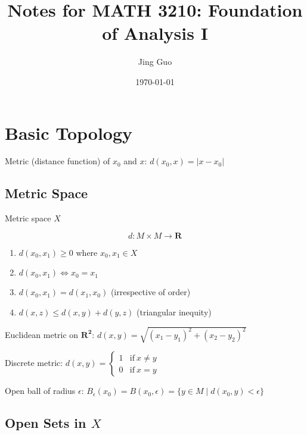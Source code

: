 \documentclass{article}
\title{Notes for MATH 3210: Foundation of Analysis I}
\author{Jing Guo}
\date{\today}
\begin{document}
    \maketitle
    \tableofcontents

    \section{Basic Topology}

    Metric (distance function) of $x_{0}$ and $x$: $d(x_{0}, x) = \lvert x - x_{0} \rvert$

    \subsection{Metric Space}

    Metric space $X$

    \begin{equation}
    d \colon M \times M \to \mathbf{R}
    \end{equation}

    \begin{enumerate}
        \item $d(x_{0}, x_{1}) \geq 0$ where $x_{0}, x_{1} \in X$
        \item $d(x_{0}, x_{1}) \iff x_{0} = x_{1}$
        \item $d(x_{0}, x_{1}) = d(x_{1}, x_{0})$ (irrespective of order)
        \item $d(x, z) \leq d(x, y) + d(y, z)$ (triangular inequity)
    \end{enumerate}

    Euclidean metric on $\mathbf{R^{2}}$:
        $d(x, y) = \sqrt{(x_{1} - y_{1})^{2} + (x_{2} - y_{2})^{2}}$

    Discrete metric: $d(x, y) = \left\{\begin{matrix}
        1 &\mbox{if}\ x \neq y \\
        0 &\mbox{if}\ x = y 
        \end{matrix}\right.$

    Open ball of radius $\epsilon$:
        $B_{\epsilon}(x_{0}) = B(x_{0}, \epsilon) = \{ y \in M \mid d(x_{0}, y) < \epsilon \}$

    \subsection{Open Sets in $X$}
    
\end{document}
